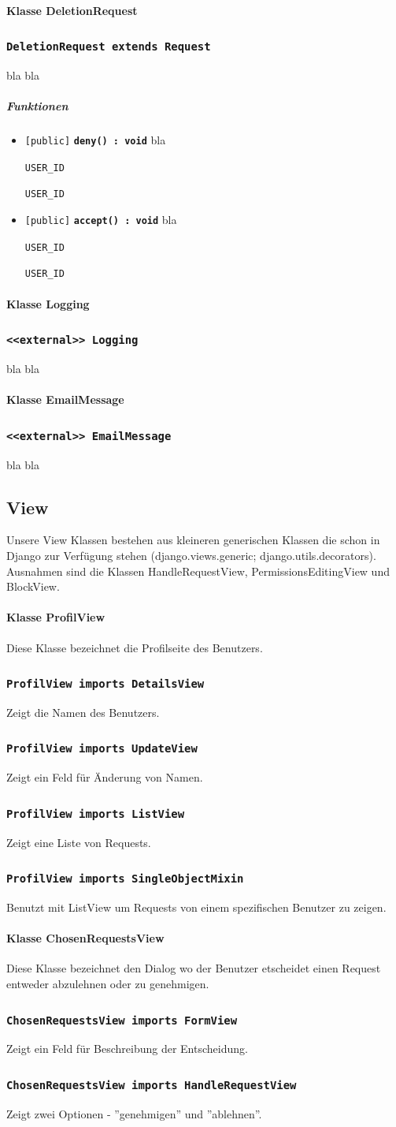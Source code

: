\documentclass[parskip=full,11pt]{scrartcl}
\makeatletter
\newcommand{\lstInline}[2][,]{%
	\begingroup%
	\lstset{#1}%
	\begin{lrbox}{\mylisting}\lstinline!#2!\end{lrbox}%
	\setlength{\@tempdima}{\linegoal}%
	\ifdim\wd\mylisting>\@tempdima\hfill\\\fi%
	\lstinline!#2!%
	\endgroup%
}
\newcommand{\class}[1]{\subsubsection*{\lstinline[basicstyle=\ttfamily\large]{#1}}}
\newcommand{\mtd}[5]{\lstinline{[#4]} \textbf{\lstinline{#1(#3) : #2}} \newline #5}
\newcommand{\inlinecode}[1]{\lstInline[breaklines=true]{#1}}
\makeatother
\begin{document}
  \paragraph*{Klasse DeletionRequest}
 \class{DeletionRequest extends Request}
 bla bla
 
\subparagraph*{Funktionen}  %
\begin{itemize}
	\item \mtd{deny}{void}{}{public}{
	bla  \inlinecode{USER_ID}
	}
	
	\item \mtd{accept}{void}{}{public}{
	bla  \inlinecode{USER_ID}
	}
\end{itemize}

  \paragraph*{Klasse Logging}
 \class{<<external>> Logging}
 bla bla
 
 
  \paragraph*{Klasse EmailMessage}
 \class{<<external>> EmailMessage}
 bla bla
 
\subsection{View}
Unsere View Klassen bestehen aus kleineren generischen Klassen die schon in Django zur Verfügung stehen (django.views.generic; django.utils.decorators). Ausnahmen sind die Klassen HandleRequestView, PermissionsEditingView und BlockView.

\paragraph*{Klasse ProfilView}
 Diese Klasse bezeichnet die Profilseite des Benutzers.
\class{ProfilView imports DetailsView} 
 Zeigt die Namen des Benutzers.
\class{ProfilView imports UpdateView}
 Zeigt ein Feld für Änderung von Namen.
\class{ProfilView imports ListView}
 Zeigt eine Liste von Requests.
\class{ProfilView imports SingleObjectMixin}
 Benutzt mit ListView um Requests von einem spezifischen Benutzer zu zeigen.
 
\paragraph*{Klasse ChosenRequestsView}
 Diese Klasse bezeichnet den Dialog wo der Benutzer etscheidet einen Request entweder abzulehnen oder zu genehmigen. 
\class{ChosenRequestsView imports FormView} 
 Zeigt ein Feld für Beschreibung der Entscheidung.
\class{ChosenRequestsView imports HandleRequestView}
 Zeigt zwei Optionen - ''genehmigen'' und ''ablehnen''.
 
\end{document}

